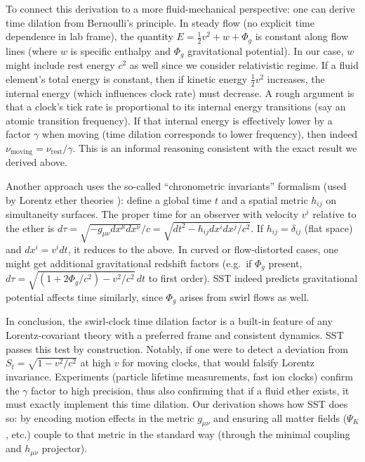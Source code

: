 \documentclass[10pt,reprint,aps,onecolumn,nofootinbib]{revtex4-2}
\begin{document}
To connect this derivation to a more fluid-mechanical perspective: one can derive time dilation from Bernoulli’s principle. In steady flow (no explicit time dependence in lab frame), the quantity $E = \frac{1}{2}v^2 + w + \Phi_g$ is constant along flow lines (where $w$ is specific enthalpy and $\Phi_g$ gravitational potential). In our case, $w$ might include rest energy $c^2$ as well since we consider relativistic regime. If a fluid element’s total energy is constant, then if kinetic energy $\frac{1}{2}v^2$ increases, the internal energy (which influences clock rate) must decrease. A rough argument is that a clock’s tick rate is proportional to its internal energy transitions (say an atomic transition frequency). If that internal energy is effectively lower by a factor $\gamma$ when moving (time dilation corresponds to lower frequency), then indeed $\nu_{\text{moving}} = \nu_{\text{rest}}/\gamma$. This is an informal reasoning consistent with the exact result we derived above.

Another approach uses the so-called “chronometric invariants” formalism (used by Lorentz ether theories \cite{Barcelo2011}): define a global time $t$ and a spatial metric $h_{ij}$ on simultaneity surfaces. The proper time for an observer with velocity $v^i$ relative to the ether is $d\tau = \sqrt{-g_{\mu\nu}dx^\mu dx^\nu}/c = \sqrt{dt^2 - h_{ij}dx^i dx^j/c^2}$. If $h_{ij} = \delta_{ij}$ (flat space) and $dx^i = v^i dt$, it reduces to the above. In curved or flow-distorted cases, one might get additional gravitational redshift factors (e.g.\ if $\Phi_g$ present, $d\tau = \sqrt{(1+2\Phi_g/c^2) - v^2/c^2}\, dt$ to first order). SST indeed predicts gravitational potential affects time similarly, since $\Phi_g$ arises from swirl flows as well.

In conclusion, the swirl-clock time dilation factor is a built-in feature of any Lorentz-covariant theory with a preferred frame and consistent dynamics. SST passes this test by construction. Notably, if one were to detect a deviation from $S_t = \sqrt{1-v^2/c^2}$ at high $v$ for moving clocks, that would falsify Lorentz invariance. Experiments (particle lifetime measurements, fast ion clocks) confirm the $\gamma$ factor to high precision, thus also confirming that if a fluid ether exists, it must exactly implement this time dilation. Our derivation shows how SST does so: by encoding motion effects in the metric $g_{\mu\nu}$ and ensuring all matter fields ($\Psi_K$, etc.) couple to that metric in the standard way (through the minimal coupling and $h_{\mu\nu}$ projector).
\end{document}
